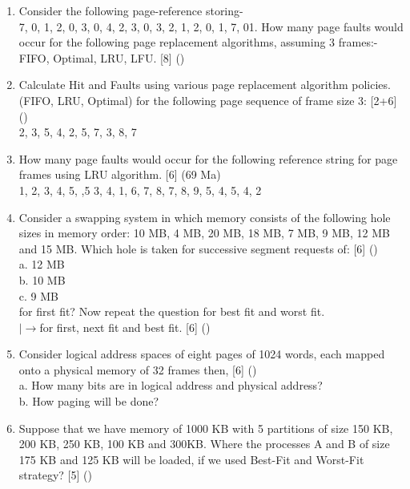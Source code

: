 \documentclass[12pt]{article}
\newcommand{\lb}{\\$\left|\rightarrow\right.$}
\begin{document}
\begin{enumerate}
			\item Consider the following page-reference storing-\\
			7, 0, 1, 2, 0, 3, 0, 4, 2, 3, 0, 3, 2, 1, 2, 0, 1, 7, 01. How many page faults would occur for the following page replacement algorithms, assuming 3 frames:-\\
			FIFO, Optimal, LRU, LFU. \hfill [8] ()

			\item Calculate Hit and Faults using various page replacement algorithm policies. (FIFO, LRU, Optimal) for the following page sequence of frame size 3: \hfill [2+6] ()\\
			2, 3, 5, 4, 2, 5, 7, 3, 8, 7

			\item How many page faults would occur for the following reference string for page frames using LRU algorithm. \hfill [6] (69 Ma)\\
			1, 2, 3, 4, 5, ,5 3, 4, 1, 6, 7, 8, 7, 8, 9, 5, 4, 5, 4, 2

			\item Consider a swapping system in which memory consists of the following hole sizes in memory order: 10 MB, 4 MB, 20 MB, 18 MB, 7 MB, 9 MB, 12 MB and 15 MB. Which hole is taken for successive segment requests of: \hfill [6] ()\\
			a. 12 MB\\
			b. 10 MB\\
			c. 9 MB\\
			for first fit? Now repeat the question for best fit and worst fit.
			\lb for first, next fit and best fit. \hfill [6] ()

			\item Consider logical address spaces of eight pages of 1024 words, each mapped onto a physical memory of 32 frames then, \hfill [6] ()\\
			a. How many bits are in logical address and physical address?\\
			b. How paging will be done?

			\item Suppose that we have memory of 1000 KB with 5 partitions of size 150 KB, 200 KB, 250 KB, 100 KB and 300KB. Where the processes A and B of size 175 KB and 125 KB will be loaded, if we used Best-Fit and Worst-Fit strategy? \hfill [5] ()


\end{enumerate}
\end{document}
